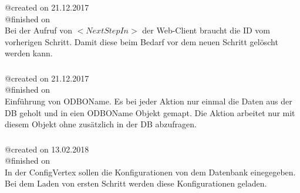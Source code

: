 \documentclass{article}
\begin{document}
\subsubsection{}
@created on 21.12.2017\\
@finished on \\

Bei der Aufruf von $<NextStepIn>$ der Web-Client braucht die ID vom vorherigen
Schritt. Damit diese beim Bedarf vor dem neuen Schritt gel\"oscht werden kann.

\subsubsection{}
@created on 21.12.2017\\
@finished on \\

Einf\"uhrung von ODBOName. Es bei jeder Aktion nur einmal die Daten aus der DB
geholt und in eien ODBOName Objekt gemapt. Die Aktion arbeitet nur mit diesem
Objekt ohne zus\"atzlich in der DB abzufragen.

\subsubsection{}
@created on 13.02.2018\\
@finished on \\

In der ConfigVertex sollen die Konfigurationen von dem Datenbank einegegeben.
Bei dem Laden von ersten Schritt werden diese Konfigurationen geladen.
\end{document}
